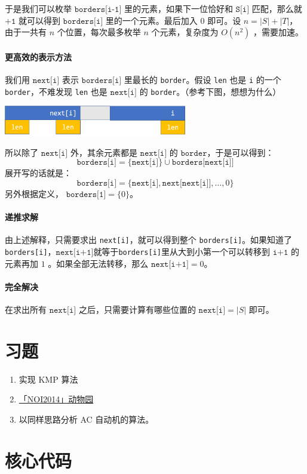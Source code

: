 \documentclass{article}
\begin{document}
于是我们可以枚举 $\texttt{borders[i-1]}$ 里的元素，如果下一位恰好和 $\texttt{S[i]}$ 匹配，那么就 $\texttt{+1}$ 就可以得到 $\texttt{borders[i]}$ 里的一个元素。最后加入 $0$ 即可。设 $n = |S|+|T|$，由于一共有 $n$ 个位置，每次最多枚举 $n$ 个元素，复杂度为 $O(n^2)$ ，需要加速。

\dotfill

\paragraph{更高效的表示方法}我们用 $\texttt{next[i]}$ 表示 $\texttt{borders[i]}$ 里最长的 \texttt{border}。假设 \texttt{len} 也是 \texttt{i} 的一个 \texttt{border}，不难发现 \texttt{len} 也是 $\texttt{next[i]}$ 的 \texttt{border}。（参考下图，想想为什么）

\begin{center}
\includegraphics[width=8cm]{2.png}
\end{center}

所以除了 $\texttt{next[i]}$ 外，其余元素都是 $\texttt{next[i]}$ 的 $\texttt{border}$，于是可以得到：
    $$\texttt{borders[i]} = \{\texttt{next[i]}\} \cup \texttt{borders[next[i]]}$$
展开写的话就是：
    $$\texttt{borders[i]} = \{\texttt{next[i]},\texttt{next[next[i]]},\ldots,0\}$$
另外根据定义， $\texttt{borders[1]} = \{0\}$。

\dotfill

\paragraph{递推求解} 由上述解释，只需要求出 \texttt{next[i]}，就可以得到整个 \texttt{borders[i]}。如果知道了\texttt{borders[i]}，$\texttt{next[i+1]}$就等于\texttt{borders[i]}里从大到小第一个可以转移到 $\texttt{i+1}$ 的元素再加 $1$  。如果全部无法转移，那么 $\texttt{next[i+1]} = 0$。

\dotfill

\paragraph{完全解决} 

在求出所有 $\texttt{next[i]}$ 之后，只需要计算有哪些位置的 $\texttt{next[i]} = |S|$ 即可。

\section{习题}
\begin{enumerate}
\item 实现 KMP 算法
\item \href{https://loj.ac/problem/2246}{「NOI2014」动物园}
\item 以同样思路分析 AC 自动机的算法。

\end{enumerate}

\newpage
\section{核心代码}
\inputminted[linenos,autogobble]{cpp}{kmp.cpp}
\end{document}
